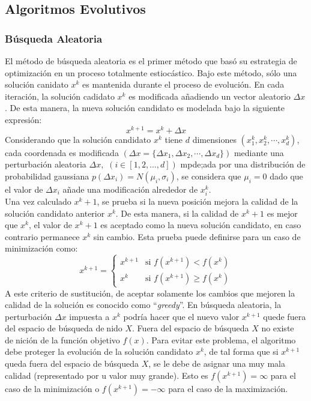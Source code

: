 \documentclass{article}
\begin{document}
\subsection{Algoritmos Evolutivos}
\subsubsection{B\'usqueda Aleatoria}
El m\'etodo de b\'usqueda aleatoria es el primer m\'etodo que bas\'o su estrategia de optimizaci\'on en un proceso totalmente estioc\'astico. Bajo este m\'etodo, s\'olo una soluci\'on canidato $x^k$ es mantenida durante el proceso de evoluci\'on. En cada iteraci\'on, la soluci\'on cadidato $x^k$ es modificada a\~nadiendo un vector aleatorio $\Delta x$. De esta manera, la nueva soluci\'on candidato es modelada bajo la siguiente expresi\'on:
\begin{equation*}
    x^{k+1} = x^{k} + \Delta x
\end{equation*}
Considerando que la soluci\'on candidato $x^k$ tiene $d$ dimensiones $\left( x_1^k,x_2^k, \cdots, x_d^k\right)$, cada coordenada es modificada $\left( \Delta x = \{ \Delta x_1, \Delta x_2, \cdots, \Delta x_d\} \right)$ mediante una perturbaci\'on aleatoria $\Delta x,$ $\left( i \in [1,2, \dots, d]\right)$ mpde;ada por una distribuci\'on de probabilidad gaussiana $p(\Delta x_i) = N(\mu_i, \sigma_i)$, se considera que $\mu_i = 0$ dado que el valor de $\Delta x_i$ a\~nade una modificaci\'on alrededor de $x_i^k$.\\Una vez calculado $x^k+1$, se prueba si la nueva posición mejora la calidad de la solución candidato anterior $x^k$. De esta manera, si la calidad de $x^k+1$ es mejor que $x^k$, el valor de $x^k+1$ es aceptado como la nueva solución candidato, en caso contrario permanece $x^k$ sin cambio.  Esta prueba puede definirse para un caso de minimización como:
\begin{equation*}
     x^{k+1} = \left \{ \begin{matrix} x^{k+1} & \mbox{si }f(x^{k+1}) < f(x^k)
\\ x^k & \mbox{si }f(x^{k+1}) \geq f(x^k)\end{matrix}\right. 
\end{equation*}
A este criterio de sustitución, de aceptar solamente los cambios que mejoren la calidad de la solución es conocido como “\textit{greedy}”. En búsqueda aleatoria, la perturbación $\Delta x$ impuesta a $x^k$ podría hacer que el nuevo valor $x^{k+1}$ quede fuera del espacio de búsqueda denido $X$. Fuera del espacio de búsqueda $X$ no existe denición de la función objetivo  $f(x)$. Para evitar este problema, el algoritmo debe proteger la evolución de la solución candidato $x^k$, de tal forma que si $x^{k+1}$ queda fuera del espacio de búsqueda $X$, se le debe de asignar una muy mala calidad (representado por u valor muy grande). Esto es $f(x^{k+1}) = \infty$ para el caso de la minimizaci\'on o $f(x^{k+1}) = - \infty$ para el caso de la maximizaci\'on.
\end{document}
